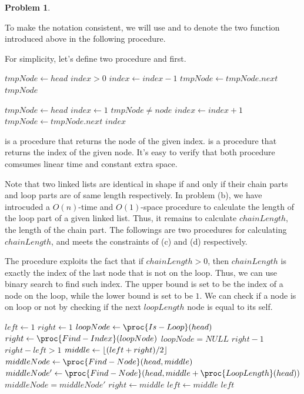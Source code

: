 \documentclass[12pt,a4paper]{report}
\newcommand{\get}{\leftarrow}
\theoremstyle{definition}
\newtheorem{problem}{\textbf{Problem}}
\theoremstyle{definition}
\DeclarePairedDelimiter\floor{\lfloor}{\rfloor}
\begin{document}
\begin{problem}
\begin{enumerate}[label=\arabic*.]
\begin{enumerate}[label=\alph*.]
\begin{framed}
    To make the notation consistent, we will use  and  to denote the two function introduced above in the following procedure.

    For simplicity, let's define two procedure  and  first.
\begin{codebox}
\li $tmpNode\get head$
\li \While $index>0$\Do
\li     $index\get index-1$
\li     $tmpNode\get tmpNode.next$
    \End
\li \Return $tmpNode$
\end{codebox}
\begin{codebox}
\li $tmpNode\get head$
\li $index\get 1$
\li \While $tmpNode\neq node$\Do
\li     $index\get index+1$
\li     $tmpNode\get tmpNode.next$
    \End
\li \Return $index$
\end{codebox}

 is a procedure that returns the node of the given index.  is a procedure that returns the index of the given node. It's easy to verify that both procedure comsumes linear time and constant extra space.

Note that two linked lists are identical in shape if and only if their chain parts and loop parts are of same length respectively. In problem (b), we have introcuded a $O(n)$-time and $O(1)$-space procedure  to calculate the length of the loop part of a given linked list. Thus, it remains to calculate $chainLength$, the length of the chain part. The followings are two procedures for calculating $chainLength$, and meets the constraints of (c) and (d) respectively.

The procedure  exploits the fact that if $chainLength>0$, then $chainLength$ is exactly the index of the last node that is not on the loop. Thus, we can use binary search to find such index. The upper bound is set to be the index of a node on the loop, while the lower bound is set to be $1$. We can check if a node is on loop or not by checking if the next $loopLength$ node is equal to its self.

\begin{codebox}
\li $left\get 1$
\li $right\get 1$
\li $loopNode\get \proc{Is-Loop}(head)$
\li $right\get \proc{Find-Index}(loopNode)$
\li \If $loopNode=NULL$ \Then
\li     \Return $right-1$
    \End
\li \While $right-left>1$ \Do
\li     $middle\get \floor{(left+right)/2}$
\li     $middleNode\get\proc{Find-Node}(head,middle)$
\li     $middleNode'\get\proc{Find-Node}(head,middle+\proc{LoopLength}(head))$
\li     \If $middleNode=middleNode'$ \Then
\li         $right\get middle$
\li     \Else
\li         $left\get middle$
        \End
    \End
\li \Return $left$
\end{codebox}


\end{framed}
\end{enumerate}
\end{enumerate}
\end{problem}
\end{document}
